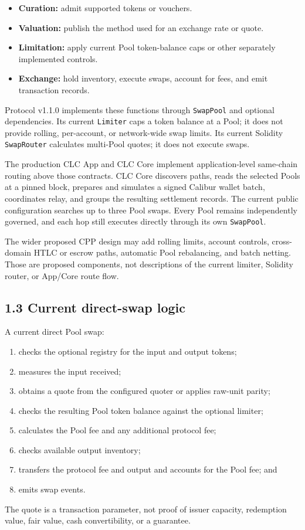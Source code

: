 \documentclass[11pt]{article}
\begin{document}
\begin{itemize}[leftmargin=*]
\item \textbf{Curation:} admit supported tokens or vouchers.
\item \textbf{Valuation:} publish the method used for an exchange rate or quote.
\item \textbf{Limitation:} apply current Pool token-balance caps or other separately implemented controls.
\item \textbf{Exchange:} hold inventory, execute swaps, account for fees, and emit transaction records.
\end{itemize}
Protocol v1.1.0 implements these functions through \texttt{SwapPool} and optional dependencies. Its current \texttt{Limiter} caps a token balance at a Pool; it does not provide rolling, per-account, or network-wide swap limits. Its current Solidity \texttt{SwapRouter} calculates multi-Pool quotes; it does not execute swaps.

The production CLC App and CLC Core implement application-level same-chain routing above those contracts. CLC Core discovers paths, reads the selected Pools at a pinned block, prepares and simulates a signed Calibur wallet batch, coordinates relay, and groups the resulting settlement records. The current public configuration searches up to three Pool swaps. Every Pool remains independently governed, and each hop still executes directly through its own \texttt{SwapPool}.

The wider proposed CPP design may add rolling limits, account controls, cross-domain HTLC or escrow paths, automatic Pool rebalancing, and batch netting. Those are proposed components, not descriptions of the current limiter, Solidity router, or App/Core route flow.

\subsection*{1.3 Current direct-swap logic}

A current direct Pool swap:

\begin{enumerate}[leftmargin=*]
\item checks the optional registry for the input and output tokens;
\item measures the input received;
\item obtains a quote from the configured quoter or applies raw-unit parity;
\item checks the resulting Pool token balance against the optional limiter;
\item calculates the Pool fee and any additional protocol fee;
\item checks available output inventory;
\item transfers the protocol fee and output and accounts for the Pool fee; and
\item emits swap events.
\end{enumerate}
The quote is a transaction parameter, not proof of issuer capacity, redemption value, fair value, cash convertibility, or a guarantee.
\end{document}
